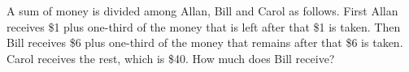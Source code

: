 A sum of money is divided among Allan, Bill and Carol as follows. First Allan receives \$1 plus one-third of the money that is left after that \$1 is taken. Then Bill receives \$6 plus one-third of the money that remains after that \$6 is taken. Carol receives the rest, which is \$40. How much does Bill receive?
